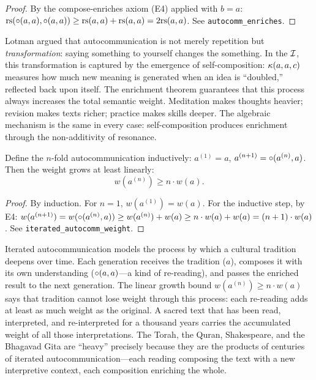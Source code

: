 \begin{proof}
By the compose-enriches axiom (E4) applied with $b = a$:
$\mathrm{rs}(\circ(a, a), \circ(a, a)) \geq \mathrm{rs}(a, a) + \mathrm{rs}(a, a) =
2\mathrm{rs}(a, a)$. See \texttt{autocomm\_enriches}.
\end{proof}

\begin{interpretation}
Lotman argued that autocommunication is not merely repetition but
\emph{transformation}: saying something to yourself changes the
something. In the $\mathcal{I}$, this transformation is captured by the
emergence of self-composition: $\kappa(a, a, c)$ measures how much
new meaning is generated when an idea is ``doubled,'' reflected back
upon itself. The enrichment theorem guarantees that this process
always increases the total semantic weight. Meditation makes thoughts
heavier; revision makes texts richer; practice makes skills deeper.
The algebraic mechanism is the same in every case: self-composition
produces enrichment through the non-additivity of resonance.
\end{interpretation}

\begin{theorem}
\label{thm:iterated-autocomm}
Define the $n$-fold autocommunication inductively: $a^{(1)} = a$, $a^{(n+1)} = \circ(a^{(n)}, a)$. Then the weight grows at least linearly:
\[
  w(a^{(n)}) \geq n \cdot w(a).
\]
\end{theorem}

\begin{proof}
By induction. For $n = 1$, $w(a^{(1)}) = w(a)$. For the inductive step, by E4: $w(a^{(n+1)}) = w(\circ(a^{(n)}, a)) \geq w(a^{(n)}) + w(a) \geq n \cdot w(a) + w(a) = (n+1) \cdot w(a)$. See \texttt{iterated\_autocomm\_weight}.
\end{proof}

\begin{interpretation}
Iterated autocommunication models the process by which a cultural tradition deepens over time. Each generation receives the tradition ($a$), composes it with its own understanding ($\circ(a, a)$---a kind of re-reading), and passes the enriched result to the next generation. The linear growth bound $w(a^{(n)}) \geq n \cdot w(a)$ says that tradition cannot lose weight through this process: each re-reading adds at least as much weight as the original. A sacred text that has been read, interpreted, and re-interpreted for a thousand years carries the accumulated weight of all those interpretations. The Torah, the Quran, Shakespeare, and the Bhagavad Gita are ``heavy'' precisely because they are the products of centuries of iterated autocommunication---each reading composing the text with a new interpretive context, each composition enriching the whole.
\end{interpretation}


